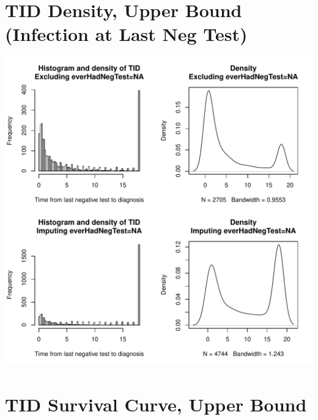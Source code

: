 \documentclass{article}\usepackage[]{graphicx}\usepackage[]{color}
\makeatletter
\def\maxwidth{ %
  \ifdim\Gin@nat@width>\linewidth
    \linewidth
  \else
    \Gin@nat@width
  \fi
}
\newenvironment{knitrout}{}{} %
\makeatother
\begin{document}
\section{TID Density, Upper Bound (Infection at Last Neg Test)}

\begin{knitrout}\footnotesize
{}\color{fgcolor}

{\centering \includegraphics[width=\maxwidth]{figure/minimal-density} 

}



\end{knitrout}


\section{TID Survival Curve, Upper Bound }
\end{document}
